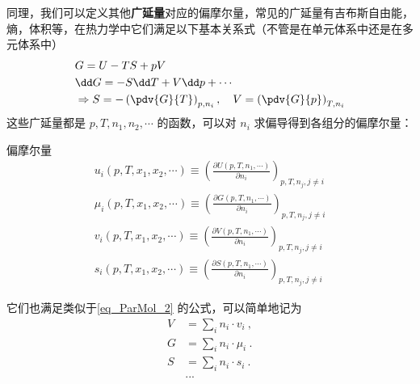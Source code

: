 同理，我们可以定义其他\textbf{广延量}对应的偏摩尔量，常见的广延量有吉布斯自由能，熵，体积等，在热力学中它们满足以下基本关系式（不管是在单元体系中还是在多元体系中）
\begin{equation}\label{eq_ParMol_3}
\begin{aligned}
&G=U-TS+pV\\
&\dd G=-S\dd T+V\dd p+\cdots\\
&\Rightarrow S=-\left(\pdv{G}{T}\right)_{p,n_i},\quad V=\left(\pdv{G}{p}\right)_{T,n_i}
\end{aligned}
\end{equation}
这些广延量都是 $p,T,n_1,n_2,\cdots$ 的函数，可以对 $n_i$ 求偏导得到各组分的偏摩尔量：
\begin{definition}{偏摩尔量}
\begin{equation}\label{eq_ParMol_4}
\begin{aligned}
u_i(p,T,x_1,x_2,\cdots )\equiv \left(\frac{\partial U(p,T,n_1,\cdots)}{\partial n_i}\right)_{p,T,n_j,j\neq i}\\
\mu_i(p,T,x_1,x_2,\cdots )\equiv \left(\frac{\partial G(p,T,n_1,\cdots)}{\partial n_i}\right)_{p,T,n_j,j\neq i}\\
v_i(p,T,x_1,x_2,\cdots )\equiv \left(\frac{\partial V(p,T,n_1,\cdots)}{\partial n_i}\right)_{p,T,n_j,j\neq i}\\
s_i(p,T,x_1,x_2,\cdots )\equiv \left(\frac{\partial S(p,T,n_1,\cdots)}{\partial n_i}\right)_{p,T,n_j,j\neq i}
\end{aligned}
\end{equation}
\end{definition}
它们也满足类似于\autoref{eq_ParMol_2} 的公式，可以简单地记为
\begin{equation}
\begin{aligned}
V &= \sum_i  n_i \cdot v_i ~,\\
G &= \sum_i  n_i \cdot \mu_i~.\\
S &= \sum_i  n_i \cdot s_i~.\\
&...\\
\end{aligned}
\end{equation}
